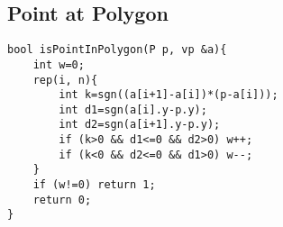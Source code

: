 \subsection{Point at Polygon}
\begin{lstlisting}
bool isPointInPolygon(P p, vp &a){
    int w=0;
    rep(i, n){
        int k=sgn((a[i+1]-a[i])*(p-a[i]));
        int d1=sgn(a[i].y-p.y);
        int d2=sgn(a[i+1].y-p.y);
        if (k>0 && d1<=0 && d2>0) w++;
        if (k<0 && d2<=0 && d1>0) w--;
    }
    if (w!=0) return 1;
    return 0;
}
\end{lstlisting}
